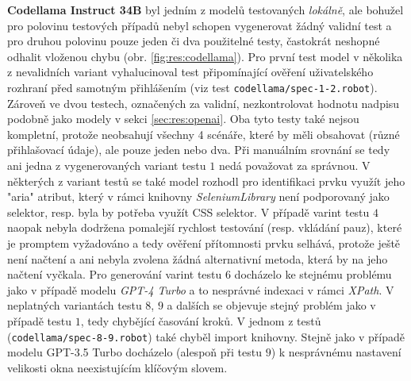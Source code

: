 \documentclass[czech, ma, kiv, he, iso690alph, pdf, viewonly]{fasthesis}
\begin{document}
            \textbf{Codellama Instruct 34B} byl jedním z modelů testovaných \textit{lokálně}, ale bohužel pro polovinu testových případů nebyl schopen vygenerovat žádný validní test a pro druhou polovinu pouze jeden či dva použitelné testy, častokrát neshopné odhalit vloženou chybu (obr. \ref{fig:res:codellama}). Pro první test model v několika z nevalidních variant vyhalucinoval test připomínající ověření uživatelského rozhraní před samotným přihlášením (viz test \verb|codellama/spec-1-2.robot|). Zároveň ve dvou testech, označených za validní, nezkontrolovat hodnotu nadpisu podobně jako modely v sekci \ref{sec:res:openai}. Oba tyto testy také nejsou kompletní, protože neobsahují všechny 4 scénáře, které by měli obsahovat (různé přihlašovací údaje), ale pouze jeden nebo dva. Při manuálním srovnání se tedy ani jedna z vygenerovaných variant testu \(1\) nedá považovat za správnou. V některých z variant testů se také model rozhodl pro identifikaci prvku využít jeho "aria" atribut, který v rámci knihovny \textit{SeleniumLibrary} není podporovaný jako selektor, resp. byla by potřeba využít CSS selektor. V případě varint testu \(4\) naopak nebyla dodržena pomalejší rychlost testování (resp. vkládání pauz), které je promptem vyžadováno a tedy ověření přítomnosti prvku selhává, protože ještě není načtení a ani nebyla zvolena žádná alternativní metoda, která by na jeho načtení vyčkala. Pro generování varint testu \(6\) docházelo ke stejnému problému jako v případě modelu \textit{GPT-4 Turbo} a to nesprávné indexaci v rámci \textit{XPath}. V neplatných variantách testu \(8\), \(9\) a dalších se objevuje stejný problém jako v případě testu \(1\), tedy chybějící časování kroků. V jednom z testů (\verb|codellama/spec-8-9.robot|) také chyběl import knihovny. Stejně jako v případě modelu GPT-3.5 Turbo docházelo (alespoň při testu \(9\)) k nesprávnému nastavení velikosti okna neexistujícím klíčovým slovem.
\end{document}
